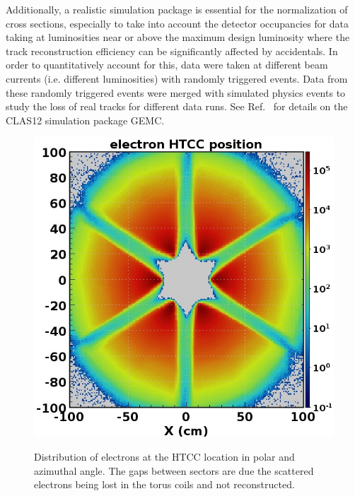 \documentclass[final,3p,twocolumn]{elsarticle}
\begin{document}
\begin{figure}[htbp!]
\label{gemc-event}
\end{figure}

Additionally, a realistic simulation package is essential for the normalization of cross sections, especially to take
into account the detector occupancies for data taking at luminosities near or above the maximum design luminosity
where the track reconstruction efficiency can be significantly affected by accidentals. In order to quantitatively
account for this, data were taken at different beam currents (i.e. different luminosities) with randomly triggered
events. Data from these randomly triggered events were merged with simulated physics events to study the loss
of real tracks for different data runs. See Ref.~\cite{GEMC} for details on the CLAS12 simulation package GEMC.

\begin{figure}[t!]
{\includegraphics[width=1.0\columnwidth]{htcc-accept.jpg}}
\caption{Distribution of electrons at the HTCC location in polar and azimuthal angle. The gaps between sectors are
  due the scattered electrons being lost in the torus coils and not reconstructed.} 
\label{htcc-electron-dis}

\end{figure}
\end{document}
